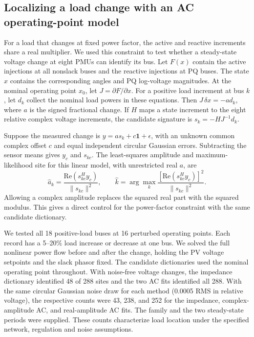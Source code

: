 \subsection{Localizing a load change with an AC operating-point model}
For a load that changes at fixed power factor, the active and reactive
increments share a real multiplier. We used this constraint to test
whether a steady-state voltage change at eight PMUs can identify its bus.
Let $F(x)$ contain the active injections at all nonslack buses and the
reactive injections at PQ buses. The state $x$ contains the corresponding
angles and PQ log-voltage magnitudes. At the nominal operating point
$x_0$, let $J=\partial F/\partial x$. For a positive load increment
at bus $k$, let $d_k$ collect the nominal load powers in these equations.
Then $J\,\delta x=-a d_k$, where $a$ is the signed fractional change.
If $H$ maps a state increment to the eight relative complex voltage
increments, the candidate signature is $s_k=-HJ^{-1}d_k$.

Suppose the measured change is $y=a s_k+c\mathbf{1}+\epsilon$, with
an unknown common complex offset $c$ and equal independent circular
Gaussian errors. Subtracting the sensor means gives $y_c$ and $s_{kc}$.
The least-squares amplitude and maximum-likelihood site for this linear
model, with unrestricted real $a$, are
\begin{equation}
 \widehat a_k=\frac{\mathrm{Re}(s_{kc}^{H}y_c)}{\|s_{kc}\|^2},
 \qquad
 \widehat k=\arg\max_k
 \frac{[\mathrm{Re}(s_{kc}^{H}y_c)]^2}{\|s_{kc}\|^2}.
\end{equation}
Allowing a complex amplitude replaces the squared real part with
the squared modulus. This gives a direct control for the power-factor
constraint with the same candidate dictionary.

We tested all 18 positive-load buses at 16 perturbed operating points.
Each record has a 5--20\% load increase or decrease at one bus. We solved
the full nonlinear power flow before and after the change, holding the PV
voltage setpoints and the slack phasor fixed. The candidate dictionaries
used the nominal operating point throughout. With noise-free voltage
changes, the impedance dictionary identified 48 of 288 sites and the
two AC fits identified all 288. With the same circular Gaussian noise
draw for each method (0.0005 RMS in relative voltage), the respective
counts were 43, 238, and 252 for the impedance, complex-amplitude AC,
and real-amplitude AC fits. The family and the two steady-state periods
were supplied. These counts characterize load location under the specified
network, regulation and noise assumptions.

